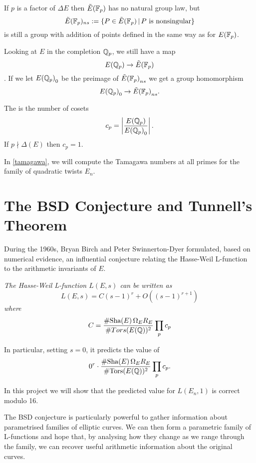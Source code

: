 \documentclass[12pt, a4paper]{report}
\begin{document}
If $p $ is a factor of $\Delta E$ then $\tilde{E}(\mathbb{F}_p)$ has no natural group law, but
\[
  \tilde{E}(\mathbb{F}_p)_{ns} := \{P \in \tilde{E}(\mathbb{F}_p) \,|\, P \text{ is nonsingular}\}
  \]
is still a group with addition of points defined in the same way as for $E(\mathbb{F}_p)$.

Looking at $E$ in the completion ${\mathbb Q}_p$, we still have a map
\[{E({\mathbb Q}_p)} \rightarrow {\tilde{E}(\mathbb{F}_p)}\].
If we let ${E({\mathbb Q}_p)}_0$ be the preimage of ${\tilde{E}(\mathbb{F}_p)}_{ns}$ we get a group homomorphism
\[ {E({\mathbb Q}_p)}_0 \rightarrow {\tilde{E}(\mathbb{F}_p)}_{ns}. \]

\begin{defn}
  The  is the number of cosets 
  $$c_p = \left| \frac{{E({\mathbb Q}_p)}}{{E({\mathbb Q}_p)}_0}
  \right|.$$
  If $p \nmid \Delta(E)$ then $c_p = 1$.
\end{defn}  

In \autoref{tamagawa}, we will compute the Tamagawa numbers at all
primes for the family of quadratic twists $E_n$. 
  
\section{The BSD Conjecture and Tunnell's Theorem}

During the 1960s, Bryan Birch and Peter Swinnerton-Dyer formulated, based
on numerical evidence, an influential conjecture relating the Hasse-Weil
L-function to the arithmetic invariants of $E$.

\begin{conj} \normalfont
  \textit{The Hasse-Weil L-function $L(E,s)$ can be written as
  \[L(E,s) = C (s-1)^r + O((s-1)^{r+1})\] where}
\begin{equation} \label{eq:bsd}
  C = \frac{\#\text{Sha}(E) \, \Omega_E R_E}{\#Tors(E({\mathbb Q}))^2} \prod_p c_p
\end{equation}
\end{conj}

In particular, setting $s = 0$, it predicts the value of
\[0^r \cdot \frac{\# \text{\normalfont Sha}(E) \, \Omega_E R_E}{\# {\text{\normalfont Tors}}(E({\mathbb Q}))^2} \prod_p c_p .\]

In this project we will show that the predicted value for $L(E_n,1)$
is correct modulo 16.

The BSD conjecture is particularly powerful to gather information about
parametrised families of elliptic curves. We can then form a parametric
family of L-functions and hope that, by analysing how they change as we range
through the family, we can recover useful
arithmetic information about the original curves.
\end{document}
